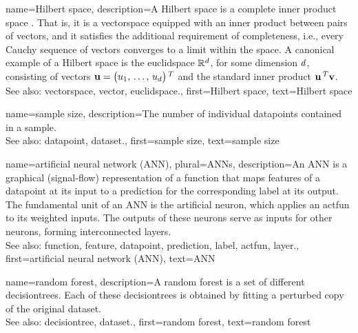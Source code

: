 {name={Hilbert space},
	description={A Hilbert space is a complete inner 
		product space \cite{introhilbertbook}. That is, it is a \gls{vectorspace} equipped 
		with an inner product between pairs of \glspl{vector}, and it satisfies the additional requirement 
		of completeness, i.e., every Cauchy sequence of \glspl{vector} converges to a limit within the space. 
		A canonical example of a Hilbert space is the \gls{euclidspace} $\mathbb{R}^{d}$, 
		for some dimension $d$, consisting of \glspl{vector} ${\bf u} = \big(u_1, \,\ldots, \,u_{d}\big)\,^{T}$ 
		and the standard inner product ${\bf u}\,^{T} {\bf v}$.
				\\
		See also: \gls{vectorspace}, \gls{vector}, \gls{euclidspace}.},
	first={Hilbert space},
	text={Hilbert space}
}



{name={sample size},
	description={The number of individual \glspl{datapoint} contained in a \gls{sample}.
				\\
		See also: \gls{datapoint}, \gls{dataset}.},
	first={sample size},
	text={sample size}
}

{name={artificial neural network (ANN)}, plural={ANNs},
	description={An ANN 
		is a graphical (signal-flow) representation of a \gls{function} that maps 
		\glspl{feature} of a \gls{datapoint} at its input to a \gls{prediction} 
		for the corresponding \gls{label} at its output. The fundamental unit of an 
		ANN is the artificial neuron, which applies an \gls{actfun} to its 
		weighted inputs. The outputs of these neurons serve as inputs for other neurons, 
		forming interconnected \glspl{layer}.
				\\
		See also: \gls{function}, \gls{feature}, \gls{datapoint}, \gls{prediction}, \gls{label}, \gls{actfun}, \gls{layer}.},
	first={artificial neural network (ANN)},
	text={ANN}
}


{name={random forest},
	description={A random forest is a set of different \glspl{decisiontree}. 
		Each of these \glspl{decisiontree} is obtained by fitting a perturbed copy of 
		the original \gls{dataset}.
				\\
		See also: \gls{decisiontree}, \gls{dataset}.},
	first={random forest}, 
	text={random forest}
}


